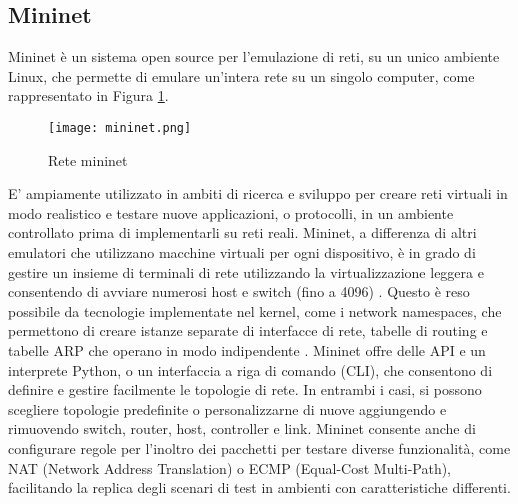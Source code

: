 \subsection{Mininet}
\label{ch:Mininet}
Mininet \cite{mininet} è un sistema open source per l'emulazione di reti, su un unico ambiente Linux, che permette di emulare un'intera rete su un singolo computer, come rappresentato in Figura \ref{fig:mininet}.
\begin{figure}[h]
    \centering
   \texttt{[image: mininet.png]}
    \caption{Rete mininet}
    \label{fig:mininet}
\end{figure}
E' ampiamente utilizzato in ambiti di ricerca e sviluppo per creare reti virtuali in modo realistico e testare nuove applicazioni, o protocolli, in un ambiente controllato prima di implementarli su reti reali.
\newline Mininet, a differenza di altri emulatori che utilizzano macchine virtuali per ogni dispositivo, è in grado di gestire un insieme di terminali di rete
utilizzando la virtualizzazione leggera e consentendo di avviare numerosi host e switch (fino a 4096) \cite{MininetOv}.
Questo è reso possibile da tecnologie implementate nel kernel, come i network namespaces, %
che permettono di creare istanze separate di interfacce di rete, tabelle di routing e tabelle ARP che operano in modo indipendente \cite{tesiMininet}. 
\newline Mininet offre delle API e un interprete Python, o un interfaccia a riga di comando (CLI), che consentono di definire e gestire facilmente le topologie di rete.
In entrambi i casi, si possono scegliere topologie predefinite o personalizzarne di nuove aggiungendo e rimuovendo switch, router, host, controller e link.
Mininet consente anche di configurare regole per l'inoltro dei pacchetti per testare diverse funzionalità, come NAT (Network Address Translation) o ECMP (Equal-Cost Multi-Path), facilitando la replica degli scenari di test in ambienti con caratteristiche differenti.
